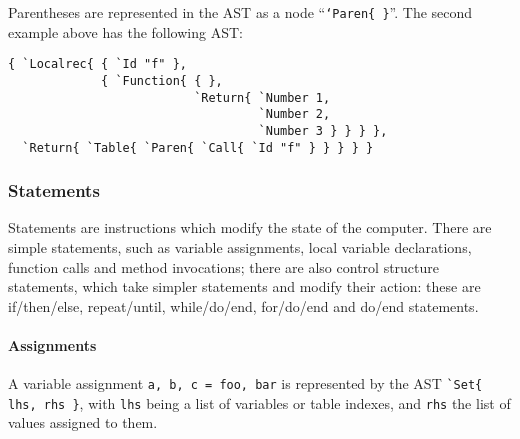 Parentheses are represented in the AST as a node ``{\tt`Paren\{
  \}}''. The second example above has the following AST:

\begin{verbatim}
{ `Localrec{ { `Id "f" },
             { `Function{ { },
                          `Return{ `Number 1,
                                   `Number 2,
                                   `Number 3 } } } },
  `Return{ `Table{ `Paren{ `Call{ `Id "f" } } } } }
\end{verbatim}

\subsubsection{Statements}

Statements are instructions which modify the state of the
computer. There are simple statements, such as variable assignments,
local variable declarations, function calls and method invocations;
there are also control structure statements, which take simpler
statements and modify their action: these are if/then/else,
repeat/until, while/do/end, for/do/end and do/end statements.

\paragraph{Assignments}
A variable assignment \verb+a, b, c = foo, bar+ is represented by the
AST \verb+`Set{ lhs, rhs }+, with {\tt lhs} being a list of variables or
table indexes, and {\tt rhs} the list of values assigned to them.

